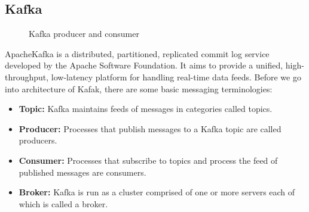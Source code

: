 \subsection{Kafka}
\begin{figure}
  \begin{center}
   \caption{Kafka producer and consumer \cite{Kafka}}
   \label{fig:kafka_producer_consumer}
  \end{center}
\end{figure}

ApacheKafka is a distributed, partitioned, replicated commit log service developed by the Apache Software Foundation. It aims to provide a unified, high-throughput, low-latency platform for handling real-time data feeds. Before we go into architecture of Kafak, there are some basic messaging terminologies: \cite{Kafka}

\begin{itemize}
  \item \textbf{Topic:} Kafka maintains feeds of messages in categories called topics. 
  \item \textbf{Producer:} Processes that publish messages to a Kafka topic are called producers.
  \item \textbf{Consumer:} Processes that subscribe to topics and process the feed of published messages are consumers.
   \item \textbf{Broker:} Kafka is run as a cluster comprised of one or more servers each of which is called a broker.
\end{itemize}


